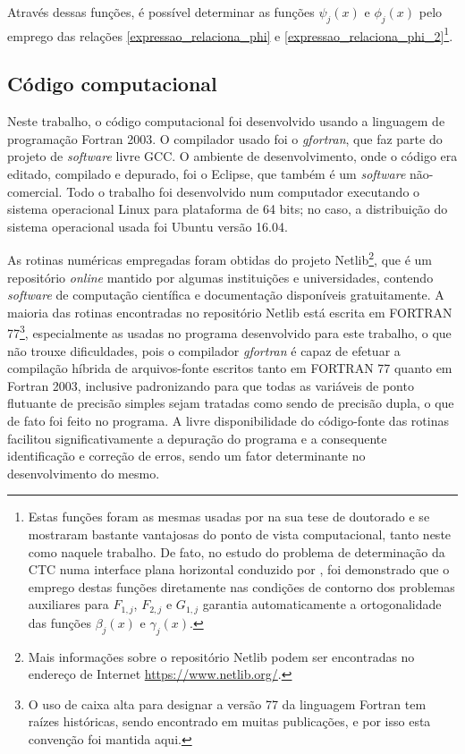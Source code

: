 Através dessas funções, é possível determinar as funções $\psi_j(x)$ e $\phi_j(x)$ pelo emprego das relações \eqref{expressao_relaciona_phi} e \eqref{expressao_relaciona_phi_2}\footnote{Estas funções foram as mesmas usadas por \cite{tese_padilha} na sua tese de doutorado e se mostraram bastante vantajosas do ponto de vista computacional, tanto neste como naquele trabalho. De fato, no estudo do problema de determinação da CTC numa interface plana horizontal conduzido por \cite{tese_padilha}, foi demonstrado que o emprego destas funções diretamente nas condições de contorno dos problemas auxiliares para $F_{1,j}$, $F_{2,j}$ e $G_{1,j}$ garantia automaticamente a ortogonalidade das funções $\beta_j(x)$ e $\gamma_j(x)$.}.

\subsection{Código computacional}\label{sobre_o_programa}

Neste trabalho, o código computacional foi desenvolvido usando a linguagem de programação Fortran 2003. O compilador usado foi o \textit{gfortran}, que faz parte do projeto de \textit{software} livre GCC. O ambiente de desenvolvimento, onde o código era editado, compilado e depurado, foi o Eclipse, que também é um \textit{software} não-comercial. Todo o trabalho foi desenvolvido num computador executando o sistema operacional Linux para plataforma de 64 bits; no caso, a distribuição do sistema operacional usada foi Ubuntu versão 16.04.

As rotinas numéricas empregadas foram obtidas do projeto Netlib\footnote{Mais informações sobre o repositório Netlib podem ser encontradas no endereço de Internet \href{https://www.netlib.org/}{https://www.netlib.org/}.}, que é um repositório \textit{online} mantido por algumas instituições e universidades, contendo \textit{software} de computação científica e documentação disponíveis gratuitamente. A maioria das rotinas encontradas no repositório Netlib está escrita em FORTRAN 77\footnote{O uso de caixa alta para designar a versão 77 da linguagem Fortran tem raízes históricas, sendo encontrado em muitas publicações, e por isso esta convenção foi mantida aqui.}, especialmente as usadas no programa desenvolvido para este trabalho, o que não trouxe dificuldades, pois o compilador \textit{gfortran} é capaz de efetuar a compilação híbrida de arquivos-fonte escritos tanto em FORTRAN 77 quanto em Fortran 2003, inclusive padronizando para que todas as variáveis de ponto flutuante de precisão simples sejam tratadas como sendo de precisão dupla, o que de fato foi feito no programa.
A livre disponibilidade do código-fonte das rotinas facilitou significativamente a depuração do programa e a consequente identificação e correção de erros, sendo um fator determinante no desenvolvimento do mesmo. 

